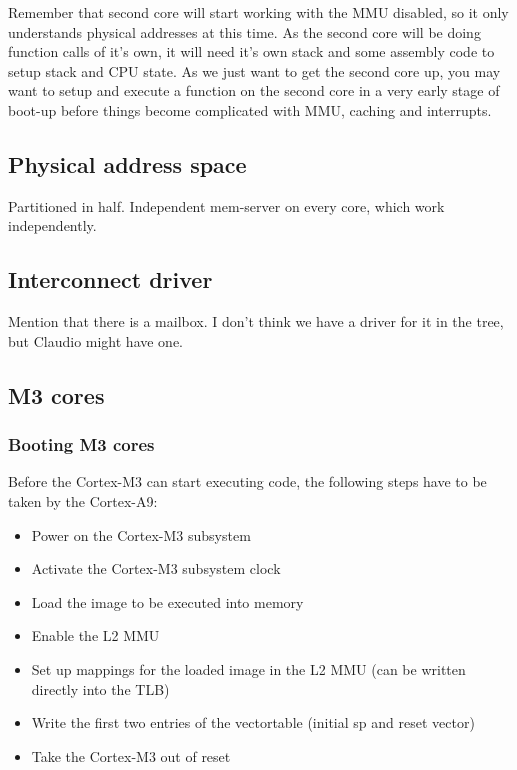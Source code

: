 \documentclass[a4paper,twoside]{report} %
\begin{document}
Remember that second core will start working with the MMU disabled, so
it only understands physical addresses at this time.  As the second
core will be doing function calls of it's own, it will need it's own
stack and some assembly code to setup stack and CPU state. As we just
want to get the second core up, you may want to setup and execute a
function on the second core in a very early stage of boot-up before
things become complicated with MMU, caching and interrupts.


\subsection{Physical address space}

Partitioned in half. Independent mem-server on every core, which work
independently.

\subsection{Interconnect driver}\label{sec:interconnect}

Mention that there is a mailbox. I don't think we have a driver for it
in the tree, but Claudio might have one.

\subsection{M3 cores}

\subsubsection{Booting M3 cores}

Before the Cortex-M3 can start executing code, the following steps
have to be taken by the Cortex-A9:

\begin{itemize}
\item Power on the Cortex-M3 subsystem
\item Activate the Cortex-M3 subsystem clock
\item Load the image to be executed into memory
\item Enable the L2 MMU
\item Set up mappings for the loaded image in the L2 MMU (can be
  written directly into the TLB)
\item Write the first two entries of the vectortable (initial sp and
  reset vector)
\item Take the Cortex-M3 out of reset
\end{itemize}
\end{document}
